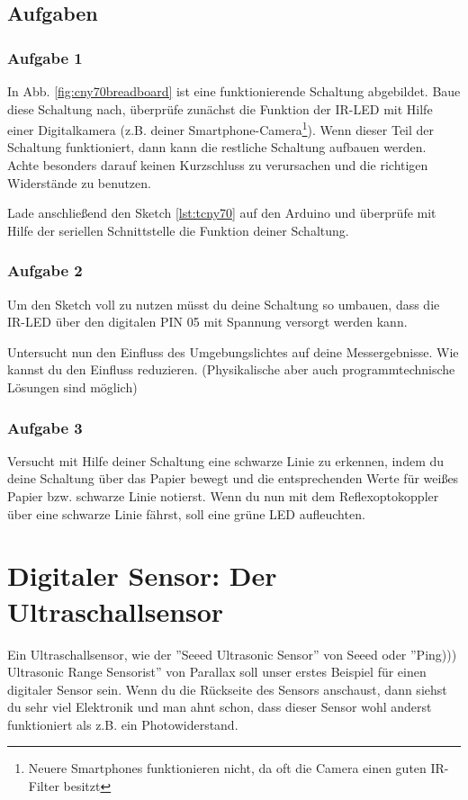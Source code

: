 \subsection{Aufgaben}
\subsubsection{Aufgabe 1}
In Abb. \ref{fig:cny70breadboard} ist eine funktionierende Schaltung abgebildet. Baue diese Schaltung nach, überprüfe zunächst die Funktion der IR-LED mit Hilfe einer Digitalkamera (z.B. deiner Smartphone-Camera\footnote{Neuere Smartphones funktionieren nicht, da oft die Camera einen guten IR-Filter besitzt}).  Wenn dieser Teil der Schaltung  funktioniert, dann kann die restliche Schaltung aufbauen werden. Achte besonders darauf keinen Kurzschluss zu verursachen und die richtigen Widerstände zu benutzen.

Lade anschließend den Sketch \ref{lst:tcny70} auf den Arduino und überprüfe mit Hilfe der seriellen Schnittstelle die Funktion deiner Schaltung.

\subsubsection{Aufgabe 2}
Um den Sketch voll zu nutzen müsst du deine Schaltung so umbauen, dass die IR-LED über den digitalen PIN 05 mit Spannung versorgt werden kann. 

Untersucht nun den Einfluss des Umgebungslichtes auf deine Messergebnisse. Wie kannst du den Einfluss reduzieren. (Physikalische aber auch programmtechnische Lösungen sind möglich)

\subsubsection{Aufgabe 3}
Versucht mit Hilfe deiner Schaltung eine schwarze Linie zu erkennen, indem du deine Schaltung über das Papier bewegt und die entsprechenden Werte für weißes Papier bzw. schwarze Linie notierst. Wenn du nun mit dem Reflexoptokoppler über eine schwarze Linie fährst, soll eine grüne LED aufleuchten. 


\clearpage


\section{Digitaler Sensor: Der Ultraschallsensor}
\label{sec:ultra}
Ein Ultraschallsensor, wie der ''Seeed Ultrasonic Sensor'' von Seeed oder ''Ping))) Ultrasonic Range Sensorist'' von Parallax soll unser erstes Beispiel für einen digitaler Sensor sein. Wenn du die Rückseite des Sensors anschaust, dann siehst du sehr viel Elektronik und man ahnt schon, dass dieser Sensor wohl anderst funktioniert als z.B. ein Photowiderstand. 

